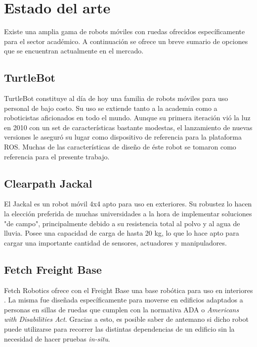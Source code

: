 \section{Estado del arte}

Existe una amplia gama de robots móviles con ruedas ofrecidos específicamente para el sector académico. A continuación se ofrece un breve sumario de opciones que se encuentran actualmente en el mercado.
\subsection{TurtleBot}

TurtleBot constituye al día de hoy una familia de robots móviles para uso personal de bajo costo. Su uso se extiende tanto a la academia como a roboticistas aficionados en todo el mundo.\newline
Aunque su primera iteración vió la luz en 2010 con un set de características bastante modestas, el lanzamiento de nuevas versiones le aseguró su lugar como dispositivo de referencia para la plataforma ROS. \newline
Muchas de las características de diseño de éste robot se tomaron como referencia para el presente trabajo.

\subsection{Clearpath Jackal}

El Jackal es un robot móvil 4x4 apto para uso en exteriores. Su robustez lo hacen la elección preferida de muchas universidades a la hora de implementar soluciones "de campo", principalmente debido a su resistencia total al polvo y al agua de lluvia.\newline
Posee una capacidad de carga de hasta 20 kg, lo que lo hace apto para cargar una importante cantidad de sensores, actuadores y manipuladores.

\subsection{Fetch Freight Base}

Fetch Robotics ofrece con el Freight Base una base robótica para uso en interiores \citep{PAPER:1}. La misma fue diseñada específicamente para moverse en edificios adaptados a personas en sillas de ruedas que cumplen con la normativa ADA o \textit{Americans with Disabilities Act}. Gracias a esto, es posible saber de antemano si dicho robot puede utilizarse para recorrer las distintas dependencias de un edificio sin la necesidad de hacer pruebas \textit{in-situ}.

